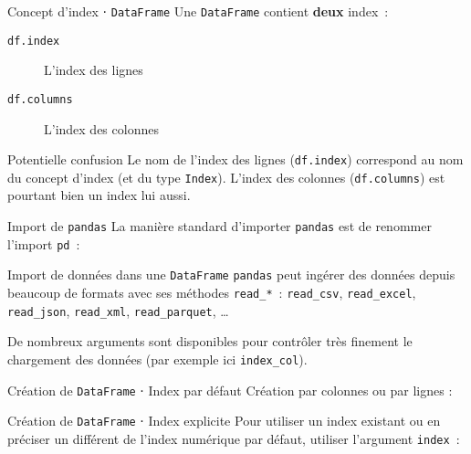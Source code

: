 \begin{frame}{Concept d'index ⋅ \texttt{DataFrame}}
  Une \texttt{DataFrame} contient \textbf{deux} index~:
  \begin{description}
    \item[\texttt{df.index}] L'index des lignes
    \item[\texttt{df.columns}] L'index des colonnes
  \end{description}


  \begin{alertblock}{Potentielle confusion}
    Le nom de l'index des lignes (\texttt{df.index}) correspond au nom du concept d'index (et du type \texttt{Index}).
    L'index des colonnes (\texttt{df.columns}) est pourtant bien un index lui aussi.
  \end{alertblock}
\end{frame}

\begin{frame}{Import de \texttt{pandas}}
  La manière standard d'importer \texttt{pandas} est de renommer l'import \texttt{pd}~:
\end{frame}

\begin{frame}{Import de données dans une \texttt{DataFrame}}
  \texttt{pandas} peut ingérer des données depuis beaucoup de formats avec ses méthodes \texttt{read\_*}~: \texttt{read\_csv}, \texttt{read\_excel}, \texttt{read\_json}, \texttt{read\_xml}, \texttt{read\_parquet}, …


  De nombreux arguments sont disponibles pour contrôler très finement le chargement des données (par exemple ici \texttt{index\_col}).
\end{frame}

\begin{frame}{Création de \texttt{DataFrame} ⋅ Index par défaut}
  Création par colonnes ou par lignes :

\end{frame}

\begin{frame}{Création de \texttt{DataFrame} ⋅ Index explicite}
  Pour utiliser un index existant ou en préciser un différent de l'index numérique par défaut, utiliser l'argument \texttt{index}~:

\end{frame}

